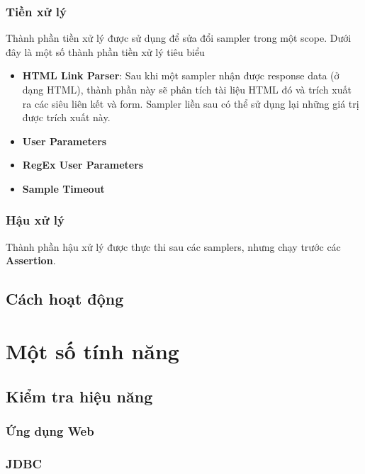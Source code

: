 \documentclass[10pt]{report}
\begin{document}
\subsection{Tiền xử lý}

\par Thành phần tiền xử lý được sử dụng để sửa đổi sampler trong một scope. Dưới đây là một số thành phần tiền xử lý tiêu biểu

\begin{itemize}
    \item \textbf{HTML Link Parser}: Sau khi một sampler nhận được response data (ở dạng HTML), thành phần này sẽ phân tích tài liệu HTML đó và trích xuất ra các siêu liên kết và form. Sampler liền sau có thể sử dụng lại những giá trị được trích xuất này.
    \item \textbf{User Parameters}
    \item \textbf{RegEx User Parameters}
    \item \textbf{Sample Timeout}
\end{itemize}

\subsection{Hậu xử lý}

\par Thành phần hậu xử lý được thực thi sau các samplers, nhưng chạy trước các \textbf{Assertion}.

\section{Cách hoạt động}

\chapter{Một số tính năng}

\section{Kiểm tra hiệu năng}

\subsection{Ứng dụng Web}

\subsection{JDBC}
\end{document}
